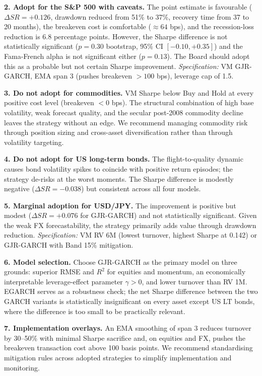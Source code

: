 \documentclass[12pt, a4paper]{article}
\begin{document}
\textbf{2. Adopt for the S\&P 500 with caveats.} The point estimate is favourable
($\Delta SR=+0.126$, drawdown reduced from 51\% to 37\%, recovery time from 37 to 20 months),
the breakeven cost is comfortable ($\approx 64$ bps), and the recession-loss reduction is
6.8 percentage points. However, the Sharpe difference is not statistically significant
($p=0.30$ bootstrap, 95\% CI $[-0.10,+0.35]$) and the Fama-French alpha is not significant
either ($p=0.13$). The Board should adopt this as a probable but not certain Sharpe
improvement. \textit{Specification:} VM GJR-GARCH, EMA span 3 (pushes breakeven $>100$ bps),
leverage cap of 1.5.

\textbf{3. Do not adopt for commodities.} VM Sharpe below Buy and Hold at every positive
cost level (breakeven $<0$ bps). The structural combination of high base volatility, weak
forecast quality, and the secular post-2008 commodity decline leaves the strategy without an
edge. We recommend managing commodity risk through position sizing and cross-asset
diversification rather than through volatility targeting.

\textbf{4. Do not adopt for US long-term bonds.} The flight-to-quality dynamic causes bond
volatility spikes to coincide with positive return episodes; the strategy de-risks at the
worst moments. The Sharpe difference is modestly negative ($\Delta SR=-0.038$) but
consistent across all four models.

\textbf{5. Marginal adoption for USD/JPY.} The improvement is positive but modest
($\Delta SR=+0.076$ for GJR-GARCH) and not statistically significant. Given the weak FX
forecastability, the strategy primarily adds value through drawdown reduction.
\textit{Specification:} VM RV 6M (lowest turnover, highest Sharpe at 0.142) or GJR-GARCH
with Band 15\% mitigation.

\textbf{6. Model selection.} Choose GJR-GARCH as the primary model on three grounds:
superior RMSE and $R^2$ for equities and momentum, an economically interpretable
leverage-effect parameter $\gamma>0$, and lower turnover than RV 1M. EGARCH serves as a
robustness check; the net Sharpe difference between the two GARCH variants is statistically
insignificant on every asset except US LT bonds, where the difference is too small to be
practically relevant.

\textbf{7. Implementation overlays.} An EMA smoothing of span 3 reduces turnover by 30--50\%
with minimal Sharpe sacrifice and, on equities and FX, pushes the breakeven transaction
cost above 100 basis points. We recommend standardising mitigation rules across adopted
strategies to simplify implementation and monitoring.
\end{document}
